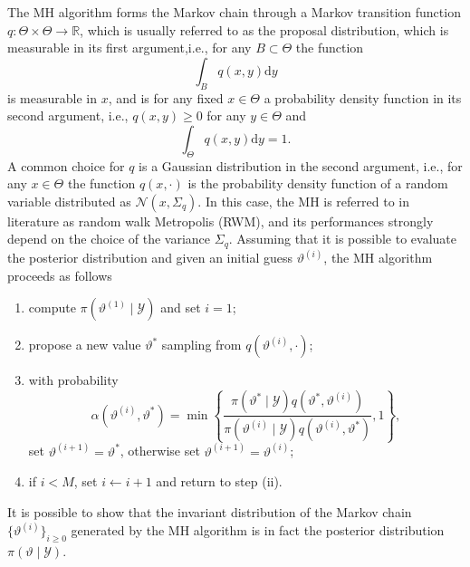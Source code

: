 \documentclass{siamart1116}
\numberwithin{theorem}{section}
\renewcommand{\theta}{\vartheta}
\newcommand{\R}{\mathbb{R}}
\newcommand{\dd}{\mathrm{d}}
\begin{document}
The MH algorithm forms the Markov chain through a Markov transition function $q\colon \Theta \times \Theta \to \R$, which is usually referred to as the proposal distribution, which is measurable in its first argument,i.e., for any $B \subset \Theta$ the function
\begin{equation}
	\int_{B} q(x, y) \dd y 
\end{equation}
is measurable in $x$, and is for any fixed $x \in \Theta$ a probability density function in its second argument, i.e., $q(x, y) \geq 0$ for any $y \in \Theta$ and 
\begin{equation}
	\int_{\Theta} q(x, y) \dd y = 1.
\end{equation}
A common choice for $q$ is a Gaussian distribution in the second argument, i.e., for any $x \in \Theta$ the function $q(x, \cdot)$ is the probability density function of a random variable distributed as $\mathcal{N}(x, \Sigma_{q})$. In this case, the MH is referred to in literature as random walk Metropolis (RWM), and its performances strongly depend on the choice of the variance $\Sigma_{q}$. Assuming that it is possible to evaluate the posterior distribution and given an initial guess $\theta^{(i)}$, the MH algorithm proceeds as follows
\begin{enumerate}
	\item compute $\pi(\theta^{(1)}\mid \mathcal{Y})$ and set $i = 1$;
	\item propose a new value $\theta^*$ sampling from $q(\theta^{(i)}, \cdot)$;
	\item with probability 
		\begin{equation}\label{eq:AcceptanceProbability}
			\alpha(\theta^{(i)}, \theta^*) = \min\left\{\frac{\pi(\theta^*\mid\mathcal{Y})q(\theta^*, \theta^{(i)})}{\pi(\theta^{(i)}\mid\mathcal{Y})q(\theta^{(i)}, \theta^*)}, 1\right\},
		\end{equation}
		set $\theta^{(i+1)} = \theta^*$, otherwise set $\theta^{(i+1)} = \theta^{(i)}$;
	\item if $i < M$, set $i \leftarrow i + 1$ and return to step (ii).
\end{enumerate}
It is possible to show that the invariant distribution of the Markov chain $\{\theta^{(i)}\}_{i\geq 0}$ generated by the MH algorithm is in fact the posterior distribution $\pi(\theta\mid\mathcal{Y})$.
\end{document}

